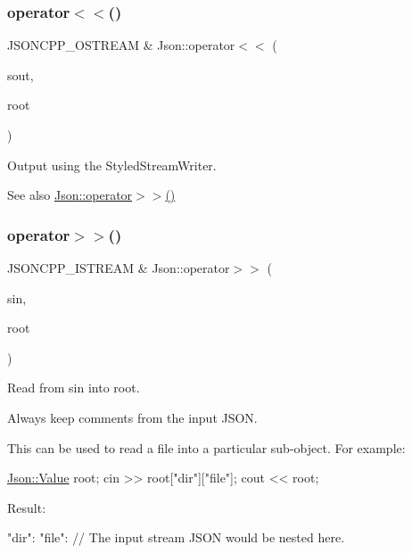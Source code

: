 \subsubsection{\texorpdfstring{operator$<$$<$()}{operator<<()}}
{\footnotesize\ttfamily J\+S\+O\+N\+C\+P\+P\+\_\+\+O\+S\+T\+R\+E\+AM \& Json\+::operator$<$$<$ (\begin{DoxyParamCaption}\item[{J\+S\+O\+N\+C\+P\+P\+\_\+\+O\+S\+T\+R\+E\+AM \&}]{sout,  }\item[{const \hyperlink{classJson_1_1Value}{Value} \&}]{root }\end{DoxyParamCaption})}



Output using the Styled\+Stream\+Writer. 

\begin{DoxySeeAlso}{See also}
\hyperlink{namespaceJson_a244ed0996aba750c40c1641c06bba449}{Json\+::operator$>$$>$()} 
\end{DoxySeeAlso}
\mbox{\label{namespaceJson_a244ed0996aba750c40c1641c06bba449}} 
\subsubsection{\texorpdfstring{operator$>$$>$()}{operator>>()}}
{\footnotesize\ttfamily J\+S\+O\+N\+C\+P\+P\+\_\+\+I\+S\+T\+R\+E\+AM \& Json\+::operator$>$$>$ (\begin{DoxyParamCaption}\item[{J\+S\+O\+N\+C\+P\+P\+\_\+\+I\+S\+T\+R\+E\+AM \&}]{sin,  }\item[{\hyperlink{classJson_1_1Value}{Value} \&}]{root }\end{DoxyParamCaption})}



Read from \textquotesingle{}sin\textquotesingle{} into \textquotesingle{}root\textquotesingle{}. 

Always keep comments from the input J\+S\+ON.

This can be used to read a file into a particular sub-\/object. For example\+: 
\begin{DoxyCode}
\hyperlink{classJson_1_1Value}{Json::Value} root;
cin >> root[\textcolor{stringliteral}{"dir"}][\textcolor{stringliteral}{"file"}];
cout << root;
\end{DoxyCode}
 Result\+: \begin{DoxyVerb}{
"dir": {
    "file": {
    // The input stream JSON would be nested here.
    }
}
}
\end{DoxyVerb}
 
